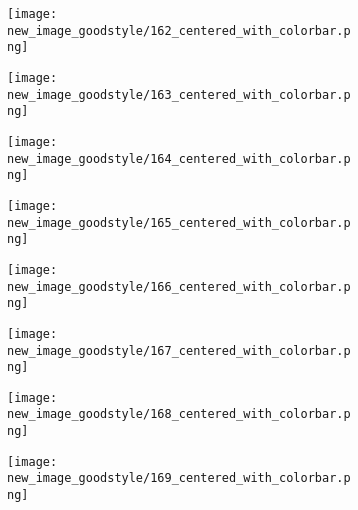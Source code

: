 \documentclass[a4paper,12pt]{article}
\begin{document}
\begin{figure}[H]
  \begin{subfigure}{0.11\textwidth}
    \texttt{[image: new\_image\_goodstyle/162\_centered\_with\_colorbar.png]}
  \end{subfigure}
  \hfill
  \begin{subfigure}{0.11\textwidth}
    \texttt{[image: new\_image\_goodstyle/163\_centered\_with\_colorbar.png]}
  \end{subfigure}
  \hfill
  \begin{subfigure}{0.11\textwidth}
    \texttt{[image: new\_image\_goodstyle/164\_centered\_with\_colorbar.png]}
  \end{subfigure}
  \hfill
  \begin{subfigure}{0.11\textwidth}
    \texttt{[image: new\_image\_goodstyle/165\_centered\_with\_colorbar.png]}
  \end{subfigure}
  \hfill
  \begin{subfigure}{0.11\textwidth}
    \texttt{[image: new\_image\_goodstyle/166\_centered\_with\_colorbar.png]}
  \end{subfigure}
  \hfill
  \begin{subfigure}{0.11\textwidth}
    \texttt{[image: new\_image\_goodstyle/167\_centered\_with\_colorbar.png]}
  \end{subfigure}
  \hfill
  \begin{subfigure}{0.11\textwidth}
    \texttt{[image: new\_image\_goodstyle/168\_centered\_with\_colorbar.png]}
  \end{subfigure}
  \hfill
  \begin{subfigure}{0.11\textwidth}
    \texttt{[image: new\_image\_goodstyle/169\_centered\_with\_colorbar.png]}
  \end{subfigure}
  \hfill
\end{figure}
\end{document}
